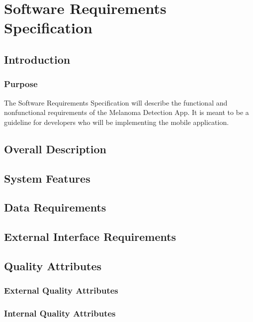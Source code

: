         


\section{Software Requirements Specification}

    \subsection{Introduction}
        \subsubsection{Purpose}

            The Software Requirements Specification will describe the functional and nonfunctional requirements of the Melanoma Detection App. It is meant to be a guideline for developers who will be implementing the mobile application.

    \subsection{Overall Description}
        

    \subsection{System Features}
        

    \subsection{Data Requirements}
    

    \subsection{External Interface Requirements}
        

    \subsection{Quality Attributes}
        \subsubsection{External Quality Attributes}
        \subsubsection{Internal Quality Attributes}






